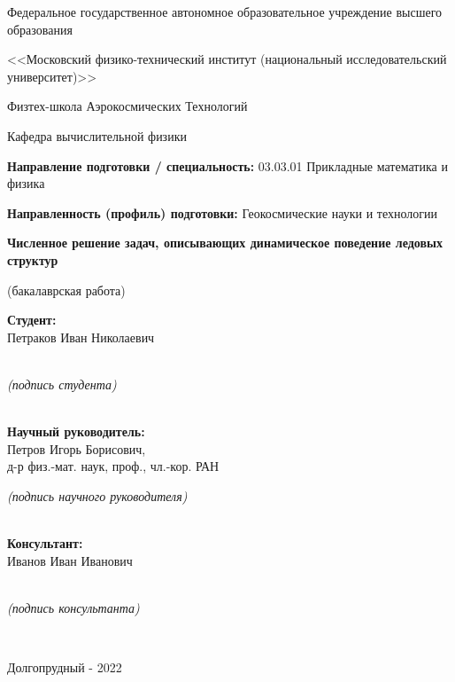 \documentclass[12pt,a4paper, titlepage, openany]{book}
\begin{document}
\begin{titlepage}
\newpage
\centerline{\footnotesize{Федеральное государственное автономное образовательное учреждение высшего образования}}
\centerline{\footnotesize{<<Московский физико-технический институт (национальный исследовательский университет)>>}}
\centerline{\footnotesize{Физтех-школа Аэрокосмических Технологий}}
\centerline{\footnotesize{Кафедра вычислительной физики}}
\hfill \break

\centerline{\footnotesize{\textbf{Направление подготовки / специальность:} 03.03.01 Прикладные математика и физика}}
\centerline{\footnotesize{\textbf{Направленность (профиль) подготовки:} Геокосмические науки и технологии}}

\hfill \break
\hfill \break
\hfill \break
\begin{center}
\Large{\textbf{Численное решение задач,
 описывающих динамическое поведение ледовых структур}}
\end{center}
\hfill \break
\centerline{(бакалаврская работа)}
\hfill \break

\small{
\begin{flushright}
\begin{minipage}{.40\textwidth}
\textbf{Студент:}\\
Петраков Иван Николаевич\\
\hfill \break
\underline{\hspace{6cm}}\\
\centerline{\footnotesize{\textit{(подпись студента)}}}\\
\hfill \break
\textbf{Научный руководитель:}\\
Петров Игорь Борисович,\\
д-р физ.-мат. наук, проф., чл.-кор. РАН
\hfill \break
\hfill \break
\underline{\hspace{6cm}}\\
\centerline{\footnotesize{\textit{(подпись научного руководителя)}}}\\
\hfill \break
\textbf{Консультант:}\\
Иванов Иван Иванович\\
\hfill \break
\underline{\hspace{6cm}}\\
\centerline{\footnotesize{\textit{(подпись консультанта)}}}\\
\end{minipage}
\end{flushright}
}
\hfill \break
\hfill \break
\centerline{Долгопрудный - 2022}
\end{titlepage}
\end{document}
